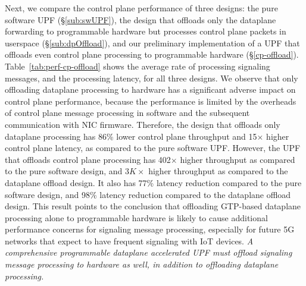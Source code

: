  Next, we compare the control plane performance of three designs: the pure software UPF (\S\ref{sub:swUPF}), the design that offloads only the dataplane forwarding to programmable hardware but processes control plane packets in userspace (\S\ref{sub:dpOffload}), and our preliminary implementation of a UPF that offloads even control plane processing to programmable hardware (\S\ref{cp-offload}). Table~\ref{tab:perf-cp-offload} shows the average rate of processing signaling messages, and the processing latency, for all three designs. We observe that only offloading dataplane processing to hardware has a significant adverse impact on control plane performance, because the performance is limited by the overheads of control plane message processing in software and the subsequent communication with NIC firmware. Therefore, the design that offloads only dataplane processing has 86\% lower control plane throughput and 15$\times$ higher control plane latency, as compared to the pure software UPF. However, the UPF that offloads control plane processing has 402$\times$ higher throughput  as compared to the pure software design, and $3K\times$ higher throughput as compared to the dataplane offload design. It also has 77\% latency reduction compared to the pure software design, and  98\% latency reduction compared to the dataplane offload design. This result points to the conclusion that offloading GTP-based dataplane processing alone to programmable hardware is likely to cause additional performance concerns for signaling message processing, especially for future 5G networks that expect to have frequent signaling with IoT devices. {\em A comprehensive programmable dataplane accelerated UPF must offload signaling message processing to hardware as well, in addition to offloading dataplane processing.}


